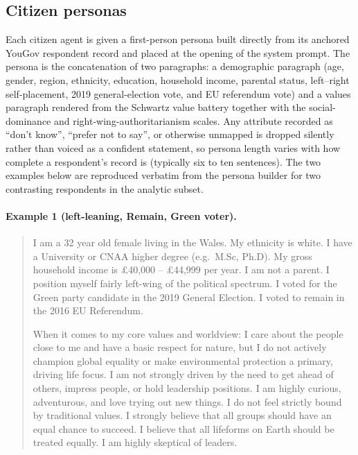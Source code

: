 \documentclass[pdflatex,sn-mathphys-num]{sn-jnl}%
\theoremstyle{thmstyleone}%
\theoremstyle{thmstyletwo}%
\theoremstyle{thmstylethree}%
\begin{document}
\subsection{Citizen personas}\label{subsec:si-citizen-personas}

Each citizen agent is given a first-person persona built directly from its
anchored YouGov respondent record and placed at the opening of the system prompt.
The persona is the concatenation of two paragraphs: a demographic paragraph (age,
gender, region, ethnicity, education, household income, parental status,
left--right self-placement, 2019 general-election vote, and EU referendum vote)
and a values paragraph rendered from the Schwartz value battery together with the
social-dominance and right-wing-authoritarianism scales. Any attribute recorded as
``don't know'', ``prefer not to say'', or otherwise unmapped is dropped silently
rather than voiced as a confident statement, so persona length varies with how
complete a respondent's record is (typically six to ten sentences). The two
examples below are reproduced verbatim from the persona builder for two
contrasting respondents in the analytic subset.

\paragraph{Example 1 (left-leaning, Remain, Green voter).}
\begin{quote}\small
I am a 32 year old female living in the Wales. My ethnicity is white. I have a
University or CNAA higher degree (e.g.\ M.Sc, Ph.D). My gross household income is
\pounds40,000 -- \pounds44,999 per year. I am not a parent. I position myself
fairly left-wing of the political spectrum. I voted for the Green party candidate
in the 2019 General Election. I voted to remain in the 2016 EU Referendum.

When it comes to my core values and worldview: I care about the people close to me
and have a basic respect for nature, but I do not actively champion global equality
or make environmental protection a primary, driving life focus. I am not strongly
driven by the need to get ahead of others, impress people, or hold leadership
positions. I am highly curious, adventurous, and love trying out new things. I do
not feel strictly bound by traditional values. I strongly believe that all groups
should have an equal chance to succeed. I believe that all lifeforms on Earth
should be treated equally. I am highly skeptical of leaders.
\end{quote}
\end{document}
